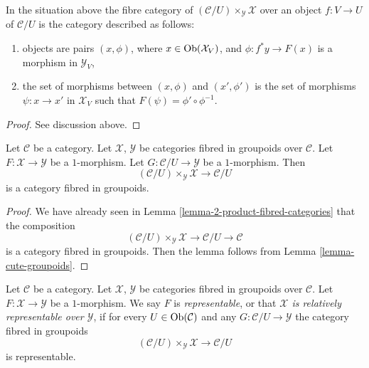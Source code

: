 \begin{lemma}
\label{lemma-identify-fibre-product}
In the situation above the fibre category of
$(\mathcal{C}/U) \times_\mathcal{Y} \mathcal{X}$ over
an object $f : V \to U$ of $\mathcal{C}/U$
is the category described as follows:
\begin{enumerate}
\item objects are pairs $(x, \phi)$,
where $x \in \mathop{\mathrm{Ob}}\nolimits(\mathcal{X}_V)$, and
$\phi : f^*y \to F(x)$ is a morphism in $\mathcal{Y}_V$,
\item the set of morphisms between $(x, \phi)$ and $(x', \phi')$
is the set of morphisms $\psi : x \to x'$ in $\mathcal{X}_V$
such that $F(\psi) = \phi' \circ \phi^{-1}$.
\end{enumerate}
\end{lemma}

\begin{proof}
See discussion above.
\end{proof}

\begin{lemma}
\label{lemma-prepare-representable-map-stack-in-groupoids}
Let $\mathcal{C}$ be a category.
Let $\mathcal{X}$, $\mathcal{Y}$ be categories fibred in groupoids
over $\mathcal{C}$.
Let $F : \mathcal{X} \to \mathcal{Y}$ be a $1$-morphism.
Let $G : \mathcal{C}/U \to \mathcal{Y}$ be a $1$-morphism.
Then
$$
(\mathcal{C}/U) \times_\mathcal{Y} \mathcal{X}
\longrightarrow
\mathcal{C}/U
$$
is a category fibred in groupoids.
\end{lemma}

\begin{proof}
We have already seen in Lemma \ref{lemma-2-product-fibred-categories}
that the composition
$$
(\mathcal{C}/U) \times_\mathcal{Y} \mathcal{X}
\longrightarrow
\mathcal{C}/U
\longrightarrow
\mathcal{C}
$$
is a category fibred in groupoids. Then the lemma follows from
Lemma \ref{lemma-cute-groupoids}.
\end{proof}

\begin{definition}
\label{definition-representable-map-categories-fibred-in-groupoids}
Let $\mathcal{C}$ be a category.
Let $\mathcal{X}$, $\mathcal{Y}$ be categories fibred in groupoids
over $\mathcal{C}$.
Let $F : \mathcal{X} \to \mathcal{Y}$ be a $1$-morphism.
We say $F$ is {\it representable}, or that
{\it $\mathcal{X}$ is relatively representable over $\mathcal{Y}$},
if for every $U \in \mathop{\mathrm{Ob}}\nolimits(\mathcal{C})$
and any $G : \mathcal{C}/U \to \mathcal{Y}$
the category fibred in groupoids
$$
(\mathcal{C}/U) \times_\mathcal{Y} \mathcal{X}
\longrightarrow
\mathcal{C}/U
$$
is representable.
\end{definition}

